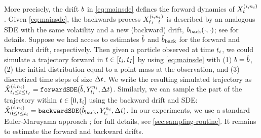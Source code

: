 More precisely, the drift $\modeldrift$ in \cref{eq:mainsde} defines the forward dynamics of $\responseat{\timet}^{ (\timeidx,\sampleidx_{\timeidx}) }$. Given \cref{eq:mainsde}, the backwards process $\responseat{\timet_{\totsteps}-\timet}^{ (\timeidx,\sampleidx_{\timeidx}) }$ is described by an analogous SDE with the same volatility and a new (backward) drift, $\modeldriftbackward(\cdot,\cdot)$; see \citet{haussmann1986time, follmer2005entropy, cattiaux2023time} for details. Suppose we had access to estimates $\estimatedrift$ and $\estimatebkwdrift$ for the forward and backward drift, respectively. Then given a particle observed at time $t_{i}$, we could simulate a trajectory forward in $t \in [t_{i},t_{I}]$ by using \cref{eq:mainsde} with (1) $\modeldrift=\estimatedrift$, (2) the initial distribution equal to a point mass at the observation, and (3) discretized time steps of size $\Delta t$. We write the resulting simulated trajectory as $\simulatedresponseat{\timestep{\timeidx}\le \timet\le \timestep{\totsteps}}^{ (i,\sampleidx_{\timeidx}) }=\textrm{\texttt{forwardSDE}}(\estimatedrift, \obsat{\timestep{\timeidx}}^{\sampleidx_{\timeidx}},\Delta \timet)$. 
Similarly, we can sample the part of the trajectory within $t \in [0,t_{i}]$ using the backward drift and SDE: $\simulatedresponseat{0\le \timet\le \timestep{\timeidx}}^{(i,\sampleidx_{\timeidx})}=\textrm{\texttt{backwardSDE}}(\estimatebkwdrift, \obsat{\timestep{\timeidx}}^{\sampleidx_{\timeidx}},\Delta \timet)$. In our experiments, we use a standard Euler-Maruyama approach \citep[][Chapter 3.4]{sarkka2019applied}; for full details, see \cref{sec:sampling-routine}.  It remains to estimate the forward and backward drifts.

